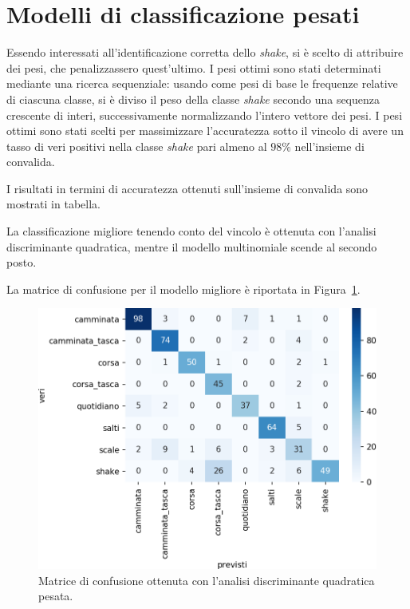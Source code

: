 \documentclass[main.tex]{subfiles}
\begin{document}
\section{Modelli di classificazione pesati}

Essendo interessati all\rq{}identificazione corretta dello {\em shake}, si è scelto di attribuire dei pesi, che penalizzassero quest\rq{}ultimo. I pesi ottimi sono stati determinati mediante una ricerca sequenziale: usando come pesi di base le frequenze relative di ciascuna classe, si è diviso il peso della classe {\em shake} secondo una sequenza crescente di interi, successivamente normalizzando l'intero vettore dei pesi. I pesi ottimi sono stati scelti per massimizzare l\rq{}accuratezza sotto il vincolo di avere un tasso di veri positivi nella classe {\em shake} pari almeno al $98\%$ nell\rq{}insieme di convalida.

I risultati in termini di accuratezza ottenuti sull\rq{}insieme di convalida sono mostrati in tabella.


La classificazione migliore tenendo conto del vincolo è ottenuta con l\rq{}analisi discriminante quadratica, mentre il modello multinomiale scende al secondo posto.

La matrice di confusione per il modello migliore è riportata in Figura~\ref{fig:qda_pen}.
\begin{figure}[H]
	\centering
	\includegraphics[width=\confusion]{../../figure/confusionMatrix-QDA-penalizzata.png}
	\caption{Matrice di confusione ottenuta con l'analisi discriminante quadratica pesata.}
	\label{fig:qda_pen}
\end{figure}
\end{document}
